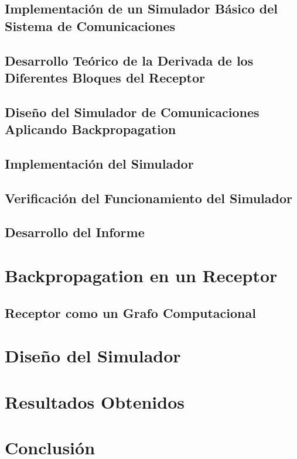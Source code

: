 \documentclass[12pt, twoside]{unc_so2_template}
\begin{document}
\section{Implementación de un Simulador Básico del Sistema de Comunicaciones}
\section{Desarrollo Teórico de la Derivada de los Diferentes Bloques del Receptor}
\section{Diseño del Simulador de Comunicaciones Aplicando Backpropagation}
\section{Implementación del Simulador}
\section{Verificación del Funcionamiento del Simulador}
\section{Desarrollo del Informe}

\chapter{Backpropagation en un Receptor}
\section{Receptor como un Grafo Computacional}

\chapter{Diseño del Simulador}

\chapter{Resultados Obtenidos}

\chapter{Conclusión}

\end{document}
